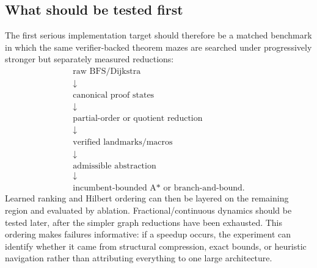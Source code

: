 \subsection{What should be tested first}
The first serious implementation target should therefore be a matched benchmark in which the same verifier-backed theorem mazes are searched under progressively stronger but separately measured reductions:
\[
\begin{array}{c}
\text{raw BFS/Dijkstra}\\
\downarrow\\
\text{canonical proof states}\\
\downarrow\\
\text{partial-order or quotient reduction}\\
\downarrow\\
\text{verified landmarks/macros}\\
\downarrow\\
\text{admissible abstraction}\\
\downarrow\\
\text{incumbent-bounded A* or branch-and-bound.}
\end{array}
\]
Learned ranking and Hilbert ordering can then be layered on the remaining region and evaluated by ablation. Fractional/continuous dynamics should be tested later, after the simpler graph reductions have been exhausted. This ordering makes failures informative: if a speedup occurs, the experiment can identify whether it came from structural compression, exact bounds, or heuristic navigation rather than attributing everything to one large architecture.
